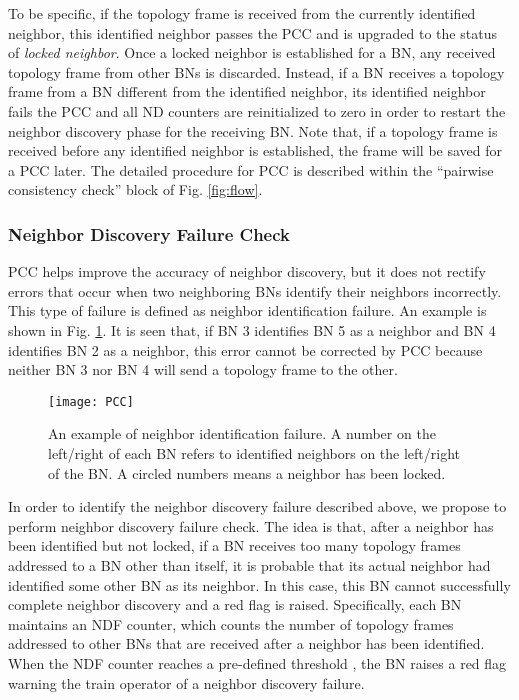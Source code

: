 \documentclass[10pt,english,two column]{IEEEtran}
\begin{document}
To be specific, if the topology frame is received from the currently
identified neighbor, this identified neighbor passes the PCC and is
upgraded to the status of \textit{locked neighbor}. Once a locked
neighbor is established for a BN, any received topology frame from
other BNs is discarded. Instead, if a BN receives a topology frame
from a BN different from the identified neighbor, its identified neighbor
fails the PCC and all ND counters are reinitialized to zero in order
to restart the neighbor discovery phase for the receiving BN. Note
that, if a topology frame is received before any identified neighbor
is established, the frame will be saved for a PCC later. The detailed
procedure for PCC is described within the ``pairwise consistency
check'' block of Fig. \ref{fig:flow}. 


\subsubsection{Neighbor Discovery Failure Check \label{sub:NDFC}}

PCC helps improve the accuracy of neighbor discovery, but it does
not rectify errors that occur when two neighboring BNs identify their
neighbors incorrectly. This type of failure is defined as neighbor
identification failure. An example is shown in Fig. \ref{fig:PCC}.
It is seen that, if BN 3 identifies BN 5 as a neighbor and BN 4 identifies
BN 2 as a neighbor, this error cannot be corrected by PCC because
neither BN 3 nor BN 4 will send a topology frame to the other. 

\begin{figure}[htbp]
\begin{centering}
\textsf{\texttt{[image: PCC]}}
\par\end{centering}

\caption{\label{fig:PCC}An example of neighbor identification failure. A number
on the left/right of each BN refers to identified neighbors on the
left/right of the BN. A circled numbers means a neighbor has been
locked. }
\end{figure}


In order to identify the neighbor discovery failure described above,
we propose to perform neighbor discovery failure check. The idea is
that, after a neighbor has been identified but not locked, if a BN
receives too many topology frames addressed to a BN other than itself,
it is probable that its actual neighbor had identified some other
BN as its neighbor. In this case, this BN cannot successfully complete
neighbor discovery and a red flag is raised. Specifically, each BN
maintains an NDF counter, which counts the number of topology frames
addressed to other BNs that are received after a neighbor has been
identified. When the NDF counter reaches a pre-defined threshold ,
the BN raises a red flag warning the train operator of a neighbor
discovery failure. 
\end{document}
